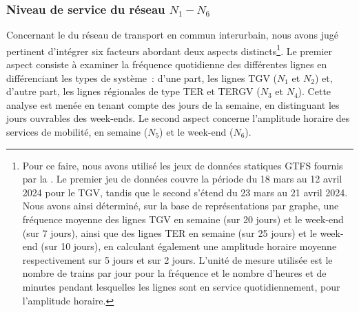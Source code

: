 \begin{refsegment}

\subsubsection*{Niveau de service du réseau \(N_{1} - N_{6}\)
    \label{chap6:indicateurs-node-niveau-service}
    }

Concernant le  du réseau de transport en commun interurbain, nous avons jugé pertinent d'intégrer six facteurs abordant deux aspects distincts\footnote{
    Pour ce faire, nous avons utilisé les jeux de données statiques \acrfull{GTFS} fournis par la \textcolor{blue}{\textcite{sncf_reseau_2024}}. Le premier jeu de données couvre la période du 18 mars au 12 avril 2024 pour le \acrshort{TGV}, tandis que le second s'étend du 23 mars au 21 avril 2024. Nous avons ainsi déterminé, sur la base de représentations par graphe, une fréquence moyenne des lignes \acrshort{TGV} en semaine (sur 20 jours) et le week-end (sur 7 jours), ainsi que des lignes \acrshort{TER} en semaine (sur 25 jours) et le week-end (sur 10 jours), en calculant également une amplitude horaire moyenne respectivement sur 5 jours et sur 2 jours. L'unité de mesure utilisée est le nombre de trains par jour pour la fréquence et le nombre d'heures et de minutes pendant lesquelles les lignes sont en service quotidiennement, pour l'amplitude horaire.
}. Le premier aspect consiste à examiner la fréquence quotidienne des différentes lignes en différenciant les types de système~: d'une part, les lignes \acrshort{TGV} (\(N_{1}\) et \(N_{2}\)) et, d'autre part, les lignes régionales de type \acrshort{TER} et \acrfull{TERGV} (\(N_{3}\) et \(N_{4}\)). Cette analyse est menée en tenant compte des jours de la semaine, en distinguant les jours ouvrables des week-ends. Le second aspect concerne l'amplitude horaire des services de mobilité, en semaine (\(N_{5}\)) et le week-end (\(N_{6}\)).%


\end{refsegment}
